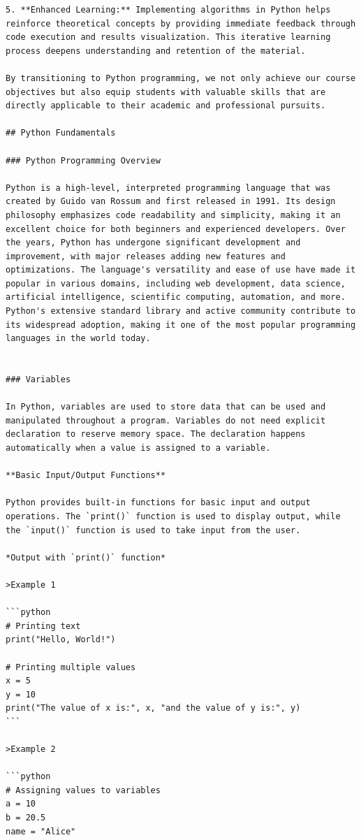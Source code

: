 \documentclass[
  letterpaper,
  DIV=11,
  numbers=noendperiod]{scrreprt}
\theoremstyle{plain}
\theoremstyle{definition}
\theoremstyle{remark}
\begin{document}
\begin{verbatim}
5. **Enhanced Learning:** Implementing algorithms in Python helps reinforce theoretical concepts by providing immediate feedback through code execution and results visualization. This iterative learning process deepens understanding and retention of the material.

By transitioning to Python programming, we not only achieve our course objectives but also equip students with valuable skills that are directly applicable to their academic and professional pursuits.

## Python Fundamentals

### Python Programming Overview

Python is a high-level, interpreted programming language that was created by Guido van Rossum and first released in 1991. Its design philosophy emphasizes code readability and simplicity, making it an excellent choice for both beginners and experienced developers. Over the years, Python has undergone significant development and improvement, with major releases adding new features and optimizations. The language's versatility and ease of use have made it popular in various domains, including web development, data science, artificial intelligence, scientific computing, automation, and more. Python's extensive standard library and active community contribute to its widespread adoption, making it one of the most popular programming languages in the world today.


### Variables

In Python, variables are used to store data that can be used and manipulated throughout a program. Variables do not need explicit declaration to reserve memory space. The declaration happens automatically when a value is assigned to a variable.

**Basic Input/Output Functions**

Python provides built-in functions for basic input and output operations. The `print()` function is used to display output, while the `input()` function is used to take input from the user.

*Output with `print()` function*

>Example 1

```python
# Printing text
print("Hello, World!")

# Printing multiple values
x = 5
y = 10
print("The value of x is:", x, "and the value of y is:", y)
```

>Example 2

```python
# Assigning values to variables
a = 10
b = 20.5
name = "Alice"


\end{verbatim}
\end{document}
